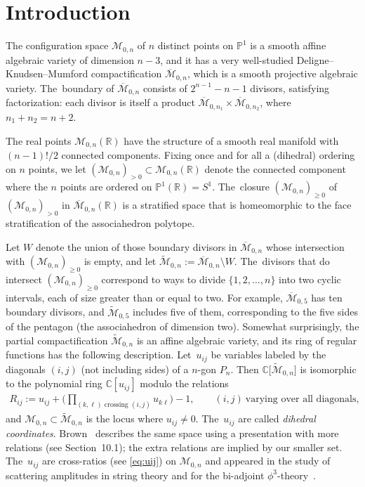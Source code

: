 \documentclass[pdftex]{sigma}%
\def\R{{\mathbb R}}
\def\C{{\mathbb C}}
\def\M{{\mathcal{M}}}
\def\tM{{\widetilde {\mathcal{M}}}}
\def\bM{{\overline {\mathcal{M}}}}
\renewcommand{\P}{{\mathbb P}}
\numberwithin{equation}{section}
\begin{document}

\section{Introduction}

\medskip{} The configuration space $\M_{0,n}$ of $n$ distinct points on $\P^1$ is a smooth affine algebraic variety of dimension $n{-}3$, and it has a very well-studied Deligne--Knudsen--Mumford compactification $\bM_{0,n}$, which is a smooth projective algebraic variety. The~boundary of $\bM_{0,n}$ consists of $2^{n{-}1}{-}n{-}1$ divisors, satisfying factorization: each divisor is itself a product $\bM_{0,n_1} \times \bM_{0,n_2}$, where $n_1{+}n_2 =n{+}2$.

The real points $\M_{0,n}(\R)$ have the structure of a smooth real manifold with $(n{-}1)!/2$ connected components. Fixing once and for all a (dihedral) ordering on $n$ points, we let $(\M_{0,n})_{>0} \subset \M_{0,n}(\R)$ denote the connected component where the $n$ points are ordered on $\P^1(\R) = S^1$. The~closure $(\M_{0,n})_{\geq 0}$ of $(\M_{0,n})_{>0}$ in $\bM_{0,n}(\R)$ is a stratified space that is homeomorphic to the face stratification of the associahedron polytope.

Let $W$ denote the union of those boundary divisors in $\bM_{0,n}$ whose intersection with $(\M_{0,n})_{\geq 0}$ is empty, and let $\tM_{0,n}:= \bM_{0,n} \setminus W$. The~divisors that do intersect $(\M_{0,n})_{\geq 0}$ correspond to ways to divide $\{1,2,\dots,n\}$ into two cyclic intervals, each of size greater than or equal to two. For example, $\bM_{0,5}$ has ten boundary divisors, and $\tM_{0,5}$ includes five of them, corresponding to the five sides of the pentagon (the associahedron of dimension two). Somewhat surprisingly, the partial compactification $\tM_{0,n}$ is an affine algebraic variety, and its ring of regular functions has the following description. Let~$u_{ij}$ be variables labeled by the diagonals $(i,j)$ (not including sides) of a $n$-gon $P_n$. Then $\C\big[\tM_{0,n}\big]$ is isomorphic to the polynomial ring $\C[u_{ij}]$ modulo the relations
\begin{gather}\label{eq:Rij}
R_{ij} := u_{ij} + \Bigg(\prod_{(k,\ell) \text{ crossing } (i,j)} u_{k\ell} \Bigg) - 1 , \qquad(i,j) \ \text{varying over all diagonals},
\end{gather}
and $\M_{0,n} \subset \tM_{0,n}$ is the locus where $u_{ij} \neq 0$. The~$u_{ij}$ are called \emph{dihedral coordinates}. Brown~\cite{Brown} describes the same space using a presentation with more relations (see Section~10.1); the extra relations are implied by our smaller set. The~$u_{ij}$ are cross-ratios (see \eqref{eq:uij}) on $\M_{0,n}$ and appeared in the study of scattering amplitudes in string theory and for the bi-adjoint $\phi^3$-theory~\cite{ABHY}.
\end{document}
